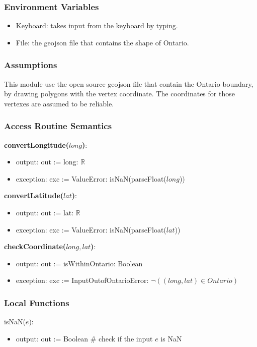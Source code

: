\documentclass[12pt, titlepage]{article}
\begin{document}
\subsubsection{Environment Variables}

\begin{itemize}
\item Keyboard: takes input from the keyboard by typing.
\item File: the geojson file that contains the shape of Ontario.
\end{itemize}

\subsubsection{Assumptions}
This module use the open source geojson file that contain the Ontario boundary, by drawing polygons with the vertex coordinate. The coordinates for those vertexes are assumed to be reliable.

\subsubsection{Access Routine Semantics}

\noindent \textbf{convertLongitude($long$)}:
\begin{itemize}
\item output: out := long: $\mathbb{R}$
\item exception: exc := ValueError: isNaN(parseFloat($long$))
\end{itemize}

\noindent \textbf{convertLatitude($lat$)}:
\begin{itemize}
\item output: out := lat: $\mathbb{R}$
\item exception: exc := ValueError: isNaN(parseFloat($lat$))
\end{itemize}

\noindent \textbf{checkCoordinate($long, lat$)}:
\begin{itemize}
\item output: out := isWithinOntario: Boolean
\item exception: exc := InputOutofOntarioError: $\lnot ((long, lat) \in Ontario)$
\end{itemize}

\subsubsection{Local Functions}
\noindent isNaN($e$):
\begin{itemize}
\item output: out := Boolean \# check if the input $e$ is NaN 
\end{itemize}
  
\end{document}

